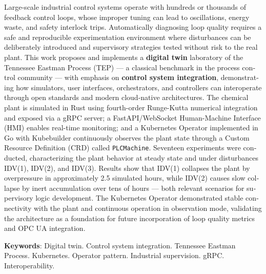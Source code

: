 
\begin{resumo}[ABSTRACT]
\begin{otherlanguage}{english}
\vspace*{-6mm}

Large-scale industrial control systems operate with hundreds or thousands of feedback control loops, whose improper tuning can lead to oscillations, energy waste, and safety interlock trips. Automatically diagnosing loop quality requires a safe and reproducible experimentation environment where disturbances can be deliberately introduced and supervisory strategies tested without risk to the real plant. This work proposes and implements a \textbf{digital twin} laboratory of the Tennessee Eastman Process (TEP) — a classical benchmark in the process control community — with emphasis on \textbf{control system integration}, demonstrating how simulators, user interfaces, orchestrators, and controllers can interoperate through open standards and modern cloud-native architectures. The chemical plant is simulated in Rust using fourth-order Runge-Kutta numerical integration and exposed via a gRPC server; a FastAPI/WebSocket Human-Machine Interface (HMI) enables real-time monitoring; and a Kubernetes Operator implemented in Go with Kubebuilder continuously observes the plant state through a Custom Resource Definition (CRD) called \texttt{PLCMachine}. Seventeen experiments were conducted, characterizing the plant behavior at steady state and under disturbances IDV(1), IDV(2), and IDV(3). Results show that IDV(1) collapses the plant by overpressure in approximately 2.5 simulated hours, while IDV(2) causes slow collapse by inert accumulation over tens of hours — both relevant scenarios for supervisory logic development. The Kubernetes Operator demonstrated stable connectivity with the plant and continuous operation in observation mode, validating the architecture as a foundation for future incorporation of loop quality metrics and OPC UA integration.

\textbf{Keywords}: Digital twin. Control system integration. Tennessee Eastman Process. Kubernetes. Operator pattern. Industrial supervision. gRPC. Interoperability.
  \end{otherlanguage}
\end{resumo}
